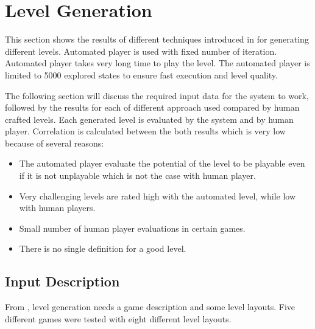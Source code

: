 \section{Level Generation}
This section shows the results of different techniques introduced in  for generating different levels. Automated player is used with fixed number of iteration. Automated player takes very long time to play the level. The automated player is limited to 5000 explored states to ensure fast execution and level quality.\\\par

The following section will discuss the required input data for the system to work, followed by the results for each of different approach used compared by human crafted levels. Each generated level is evaluated by the system and by human player. Correlation is calculated between the both results which is very low because of several reasons:
\begin{itemize} \itemsep0pt \parskip0pt 
	\item The automated player evaluate the potential of the level to be playable even if it is not unplayable which is not the case with human player. 
	\item Very challenging levels are rated high with the automated level, while low with human players.
	\item Small number of human player evaluations in certain games.
	\item There is no single definition for a good level.
\end{itemize}

\subsection{Input Description}
From , level generation needs a game description and some level layouts. Five different games were tested with eight different level layouts.

